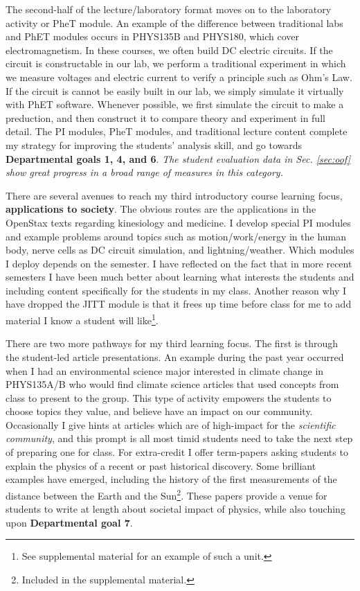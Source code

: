\documentclass[../../../main.tex]{subfiles}
\begin{document}
The second-half of the lecture/laboratory format moves on to the laboratory activity or PheT module.  An example of the difference between traditional labs and PhET modules occurs in PHYS135B and PHYS180, which cover electromagnetism.  In these courses, we often build DC electric circuits.  If the circuit is constructable in our lab, we perform a traditional experiment in which we measure voltages and electric current to verify a principle such as Ohm's Law.  If the circuit is cannot be easily built in our lab, we simply simulate it virtually with PhET software.  Whenever possible, we first simulate the circuit to make a preduction, and then construct it to compare theory and experiment in full detail.  The PI modules, PheT modules, and traditional lecture content complete my strategy for improving the students' analysis skill, and go towards \textbf{Departmental goals 1, 4, and 6}.  \textit{The student evaluation data in Sec. \ref{sec:oof} show great progress in a broad range of measures in this category.} \\ \hspace{0.1cm}

There are several avenues to reach my third introductory course learning focus, \textbf{applications to society}.  The obvious routes are the applications in the OpenStax texts \cite{openstax1} regarding kinesiology and medicine.  I develop special PI modules and example problems around topics such as motion/work/energy in the human body, nerve cells as DC circuit simulation, and lightning/weather.  Which modules I deploy depends on the semester.  I have reflected on the fact that in more recent semesters I have been much better about learning what interests the students and including content specifically for the students in my class.  Another reason why I have dropped the JITT module is that it frees up time before class for me to add material I know a student will like\footnote{See supplemental material for an example of such a unit.}.

There are two more pathways for my third learning focus.  The first is through the student-led article presentations.  An example during the past year occurred when I had an environmental science major interested in climate change in PHYS135A/B who would find climate science articles that used concepts from class to present to the group.  This type of activity empowers the students to choose topics they value, and believe have an impact on our community.  Occasionally I give hints at articles which are of high-impact for the \textit{scientific community}, and this prompt is all most timid students need to take the next step of preparing one for class.  For extra-credit I offer term-papers asking students to explain the physics of a recent or past historical discovery.  Some brilliant examples have emerged, including the history of the first measurements of the distance between the Earth and the Sun\footnote{Included in the supplemental material.}.  These papers provide a venue for students to write at length about societal impact of physics, while also touching upon \textbf{Departmental goal 7}.  \\ \hspace{0.1cm}
\end{document}

